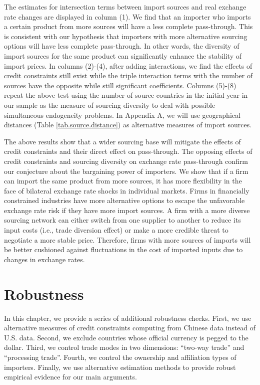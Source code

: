 \documentclass[12pt]{article}
\begin{document}
The estimates for intersection terms between import sources and real exchange rate changes are displayed in column (1). We find that an importer who imports a certain product from more sources will have a less complete pass-through. This is consistent with our hypothesis that importers with more alternative sourcing options will have less complete pass-through. In other words, the diversity of import sources for the same product can significantly enhance the stability of import prices. In columns (2)-(4), after adding interactions, we find the effects of credit constraints still exist while the triple interaction terms with the number of sources have the opposite while still significant coefficients. Columns (5)-(8) repeat the above test using the number of source countries in the initial year in our sample as the measure of sourcing diversity to deal with possible simultaneous endogeneity problems. In Appendix A, we will use geographical distances (Table \ref{tab.source.distance}) as alternative measures of import sources.

The above results show that a wider sourcing base will mitigate the effects of credit constraints and their direct effect on pass-through. The opposing effects of credit constraints and sourcing diversity on exchange rate pass-through confirm our conjecture about the bargaining power of importers. We show that if a firm can import the same product from more sources, it has more flexibility in the face of bilateral exchange rate shocks in individual markets. Firms in financially constrained industries have more alternative options to escape the unfavorable exchange rate risk if they have more import sources. A firm with a more diverse sourcing network can either switch from one supplier to another to reduce its input costs (i.e., trade diversion effect) or make a more credible threat to negotiate a more stable price. Therefore, firms with more sources of imports will be better cushioned against fluctuations in the cost of imported inputs due to changes in exchange rates.

\section{Robustness} \label{Robustness}

In this chapter, we provide a series of additional robustness checks. First, we use alternative measures of credit constraints computing from Chinese data instead of U.S. data. Second, we exclude countries whose official currency is pegged to the dollar. Third, we control trade modes in two dimensions: ``two-way trade'' and ``processing trade''. Fourth, we control the ownership and affiliation types of importers. Finally, we use alternative estimation methods to provide robust empirical evidence for our main arguments.
\end{document}
